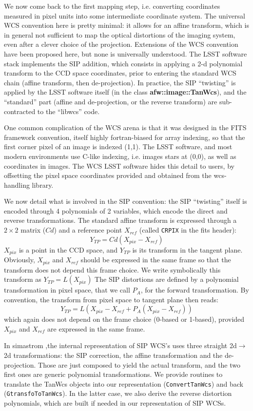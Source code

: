 \documentclass[a4paper,12pt]{scrartcl}
\newcommand{\ClName}[1]{{\bf #1}}
\newcommand{\RoutineName}[1]{\texttt{#1}}
\def\bf{\normalfont\bfseries}
\begin{document}
We now come back to the first mapping step, i.e. converting
coordinates measured in pixel units into some intermediate coordinate
system.  The universal WCS convention here is pretty minimal: it
allows for an affine transform, which is in general not sufficient to
map the optical distortions of the imaging system, even after a clever
choice of the projection. Extensions of the WCS convention have been
proposed here, but none is universally understood. The LSST software
stack implements the SIP addition, which consists in applying a 2-d
polynomial transform to the CCD space coordinates, prior to entering
the standard WCS chain (affine transform, then de-projection). In practice,
the SIP ``twisting'' is applied by the LSST software itself 
(in the class \ClName{afw::image::TanWcs}), and 
the ``standard'' part (affine and de-projection, or the reverse transform)
are sub-contracted to the ``libwcs'' code. 

One common complication of the WCS arena is that it was designed
in the FITS framework convention, itself highly fortran-biased
for array indexing, so that the first corner pixel of an image is 
indexed (1,1). The LSST software, and most modern environments use
C-like indexing, i.e. images stars at (0,0), as well as coordinates
in images. The WCS LSST software hides this detail to users, by
offsetting the pixel space coordinates provided and obtained from
the wcs-handling library.

We now detail what is involved in the SIP convention: the SIP
``twisting'' itself is encoded through 4 polynomials of 2 variables,
which encode the direct and reverse transformations. The standard
affine transform is expressed through a $2\times 2$ matrix ($Cd$) and
a reference point $X_{ref}$ (called \verb'CRPIX' in the fits header):
$$
 Y_{TP} = Cd (X_{pix} - X_{ref})
$$
$X_{pix}$ is a point in the CCD
space, and $Y_{TP}$ is its transform in the tangent plane. Obviously,
$X_{pix}$ and $ X_{ref}$ should be expressed in the same frame so that
the transform does not depend this frame choice. We write symbolically
this transform as $ Y_{TP} = L(X_{pix})$
The SIP distortions are defined by a polynomial transformation
in pixel space, that we call $P_A$, for the forward transformation.
By convention, the transform from pixel space to tangent plane then
reads:
$$
 Y_{TP} = L\left( X_{pix} - X_{ref} + P_A( X_{pix} - X_{ref}) \right )
$$
which again does not depend on the frame choice (0-based or 1-based),
provided $X_{pix}$ and $X_{ref}$ are expressed in the same frame.

In simastrom ,the internal representation of SIP WCS's uses three
straight 2d$\rightarrow$2d transformations: the SIP correction, the
affine transformation and the de-projection. Those are just composed
to yield the actual transform, and the two first ones are generic
polynomial transformations. We provide routines to translate the
TanWcs objects into our representation (\RoutineName{ConvertTanWcs})
and back (\RoutineName{GtransfoToTanWcs}). In the latter case, we also
derive the reverse distortion polynomials, which are built if needed
in our representation of SIP WCSs.
\end{document}
